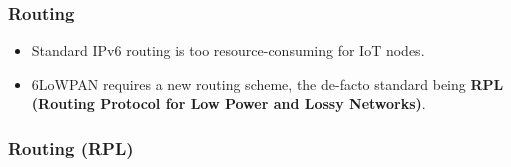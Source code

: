 \documentclass[a4paper, 12pt]{book} %
\begin{document}
\subsubsection{Routing}\label{routing}

\begin{itemize}
\tightlist
\item
  Standard IPv6 routing is too resource-consuming for IoT nodes.
\item
  6LoWPAN requires a new routing scheme, the de-facto standard being
  \textbf{RPL (Routing Protocol for Low Power and Lossy Networks)}.
\end{itemize}

\subsubsection{Routing (RPL)}\label{routing-rpl}
\end{document}
